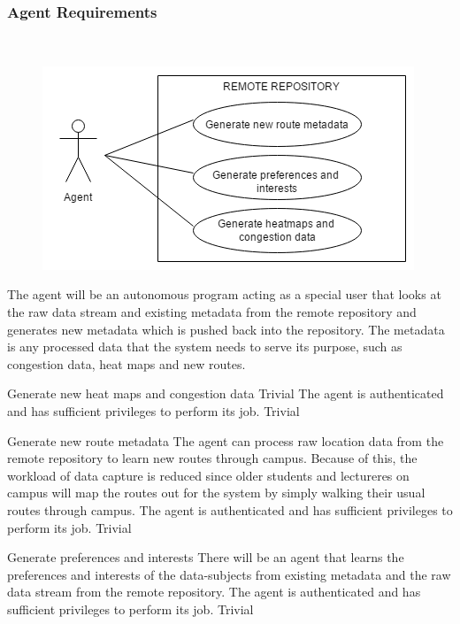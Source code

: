 \subsubsection{Agent Requirements}\mbox{}\\
\begin{figure} 
  \includegraphics[width=\textwidth]{diagrams/Specific_Requirements/Agent_Use_Case.png}
\end{figure}
The agent will be an autonomous program acting as a special user that looks at the raw data stream and existing metadata from the remote repository and generates new metadata which is pushed back into the repository. The metadata is any processed data that the system needs to serve its purpose, such as congestion data, heat maps and new routes.
\\
\bigskip

\FuncReq
{Generate new heat maps and congestion data}
{Trivial}
{The agent is authenticated and has sufficient privileges to perform its job.}
{Trivial}

\FuncReq
{Generate new route metadata}
{The agent can process raw location data from the remote repository to learn new routes through campus. Because of this, the workload of data capture is reduced since older students and lectureres on campus will map the routes out for the system by simply walking their usual routes through campus.}
{The agent is authenticated and has sufficient privileges to perform its job.}
{Trivial}

\FuncReq
{Generate preferences and interests}
{There will be an agent that learns the preferences and interests of the data-subjects from existing metadata and the raw data stream from the remote repository.}
{The agent is authenticated and has sufficient privileges to perform its job.}
{Trivial}
 
